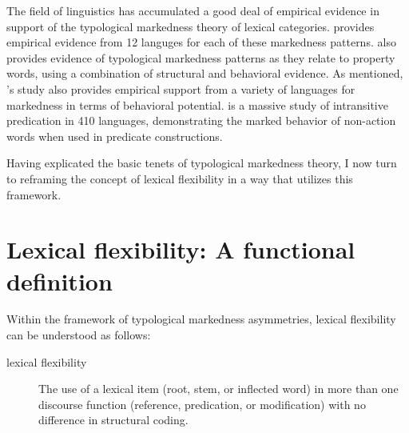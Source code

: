 The field of linguistics has accumulated a good deal of empirical evidence in support of the typological markedness theory of lexical categories. \textcite{Croft1991} provides empirical evidence from 12 languges for each of these markedness patterns. \textcite{Dixon1977} also provides evidence of typological markedness patterns as they relate to property words, using a combination of structural and behavioral evidence. As mentioned, \citeauthor{HopperThompson1984}'s \parencite*{HopperThompson1984} study also provides empirical support from a variety of languages for markedness in terms of behavioral potential. \textcite{Stassen1997} is a massive study of intransitive predication in 410 languages, demonstrating the marked behavior of non-action words when used in predicate constructions.

Having explicated the basic tenets of typological markedness theory, I now turn to reframing the concept of lexical flexibility in a way that utilizes this framework.

\section{Lexical flexibility: A functional definition}
\label{sec:2.5}

Within the framework of typological markedness asymmetries, lexical flexibility can be understood as follows:

\begin{description}
  \item[lexical flexibility] The use of a lexical item (root, stem, or inflected word) in more than one discourse function (reference, predication, or modification) with no difference in structural coding.
\end{description}

